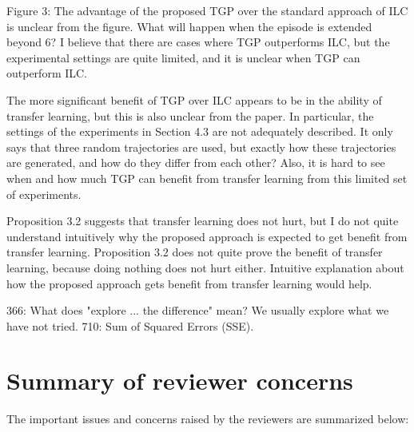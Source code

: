 \documentclass[10pt,a4paper]{article}
\begin{document}
Figure 3: The advantage of the proposed TGP over the standard approach of ILC is unclear from the figure. What will happen when the episode is extended beyond 6? I believe that there are cases where TGP outperforms ILC, but the experimental settings are quite limited, and it is unclear when TGP can outperform ILC.

The more significant benefit of TGP over ILC appears to be in the ability of transfer learning, but this is also unclear from the paper. In particular, the settings of the experiments in Section 4.3 are not adequately described. It only says that three random trajectories are used, but exactly how these trajectories are generated, and how do they differ from each other? Also, it is hard to see when and how much TGP can benefit from transfer learning from this limited set of experiments. 

Proposition 3.2 suggests that transfer learning does not hurt, but I do not quite understand intuitively why the proposed approach is expected to get benefit from transfer learning. Proposition 3.2 does not quite prove the benefit of transfer learning, because doing nothing does not hurt either. Intuitive explanation about how the proposed approach gets benefit from transfer learning would help.

366: What does "explore ... the difference" mean? We usually explore what we have not tried.
710: Sum of Squared Errors (SSE).

\section{Summary of reviewer concerns}

The important issues and concerns raised by the reviewers are summarized below:
\end{document}
